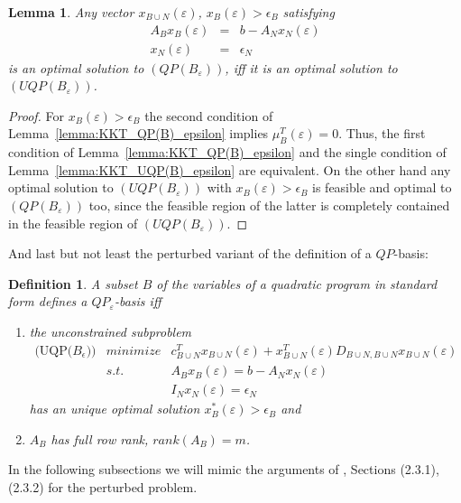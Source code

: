 \documentclass[a4paper]{article}
\newtheorem{lemma}{Lemma}
\newtheorem{definition}{Definition}
\begin{document}
\begin{lemma}
\label{lemma:strict}
Any vector $x_{B \cup N}(\varepsilon)$, $x_{B}(\varepsilon) > \epsilon_{B}$
satisfying
\begin{eqnarray}
A_{B}x_{B}(\varepsilon) & = & b - A_{N}x_{N}(\varepsilon) \\
x_{N}(\varepsilon) &  = & \epsilon_{N}
\end{eqnarray}
is an optimal solution to $(QP(B_{\varepsilon}))$, iff it is an optimal
solution to $(UQP(B_{\varepsilon}))$.
\end{lemma}

\begin{proof}
For $x_{B}(\varepsilon) > \epsilon_{B}$ the second condition of
Lemma~\ref{lemma:KKT_QP(B)_epsilon} implies $\mu_{B}^{T}(\varepsilon)=0$.
Thus, the first condition of Lemma~\ref{lemma:KKT_QP(B)_epsilon} and the
single condition of Lemma~\ref{lemma:KKT_UQP(B)_epsilon} are equivalent.
On the other hand any optimal solution to $(UQP(B_{\varepsilon}))$ with
$x_{B}(\varepsilon) > \epsilon_{B}$ is feasible and optimal to
$(QP(B_{\varepsilon}))$ too, since the feasible region of the latter is
completely contained in the feasible region of $(UQP(B_{\varepsilon}))$.
\end{proof}

And last but not least the perturbed variant of the definition of a $QP$-basis:
\begin{definition}
A subset $B$ of the variables of a quadratic program in standard form defines
a $QP_{\varepsilon}$-basis iff
\begin{enumerate}
  \item the unconstrained subproblem
    \begin{eqnarray}
      \mbox{(UQP($B_{\epsilon}$))} & minimize & c_{B \cup N}^{T}
       x_{B \cup N}(\varepsilon) 
        + x_{B \cup N}^{T}(\varepsilon)D_{B \cup N, B \cup N}
	x_{B \cup N}(\varepsilon)  \nonumber\\
\label{eq:QP_eps_basis_feasibility_B}
      & s.t.  &A_{B} x_{B}(\varepsilon) = b - A_{N}x_{N}(\varepsilon)  \\
\label{eq:QP_eps_basis_feasibility_N}
           &  &I_{N} x_{N}(\varepsilon) = \epsilon_{N}   
    \end{eqnarray}
    has an unique optimal solution $x_{B}^{*}(\varepsilon) > \epsilon_{B}$ and 
  \item $A_{B}$ has full row rank, $rank(A_{B})=m$. 
\end{enumerate}
\end{definition}
In the following subsections we will mimic the arguments of \cite{Sven},
Sections (2.3.1), (2.3.2) for the perturbed problem.
\end{document}
